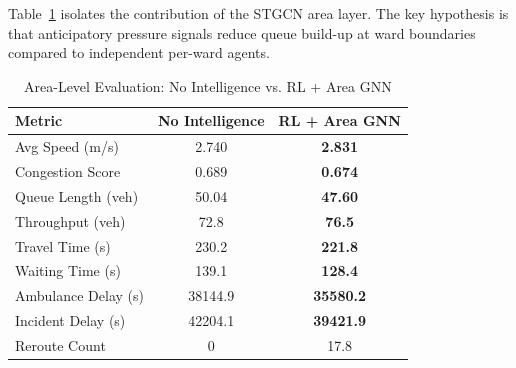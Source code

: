\documentclass[conference]{IEEEtran}
\begin{document}
Table~\ref{tab:area_results} isolates the contribution of the STGCN area
layer. The key hypothesis is that anticipatory pressure signals reduce queue
build-up at ward boundaries compared to independent per-ward agents.

\begin{table}[!t]
\caption{Area-Level Evaluation: No Intelligence vs. RL + Area GNN}
\label{tab:area_results}
\centering
\renewcommand{\arraystretch}{1.2}
\begin{tabular}{lcc}
\toprule
\textbf{Metric} & \textbf{No Intelligence} & \textbf{RL + Area GNN} \\
\midrule
Avg Speed (m/s)       & 2.740   & \textbf{2.831} \\
Congestion Score      & 0.689   & \textbf{0.674} \\
Queue Length (veh)    & 50.04   & \textbf{47.60} \\
Throughput (veh)      & 72.8    & \textbf{76.5} \\
Travel Time (s)       & 230.2   & \textbf{221.8} \\
Waiting Time (s)      & 139.1   & \textbf{128.4} \\
Ambulance Delay (s)   & 38144.9 & \textbf{35580.2} \\
Incident Delay (s)    & 42204.1 & \textbf{39421.9} \\
Reroute Count         & 0       & 17.8 \\
\bottomrule
\end{tabular}
\end{table}
\end{document}
